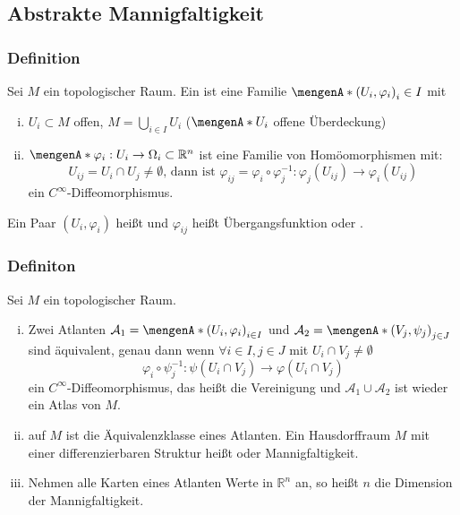 \subsection{Abstrakte Mannigfaltigkeit}
\label{sub:12}

\subsubsection[Definition: Karte und Atlas]{Definition}
\label{ssub:113}
Sei $M$ ein topologischer Raum. Ein  ist eine Familie $\set{(U_i,\varphi_i)}_i\in I$ mit
\begin{enumerate}[(i)]
	\item $U_i \subset M$ offen, $M = \bigcup_{i \in I} U_i$ ($\set{U_i}$ offene Überdeckung)
	\item $\set{\varphi_i:U_i \to \Omega_i \subset \mathds{R}^n}$ ist eine Familie von Homöomorphismen mit:
	\[
		U_{ij} = U_i \cap U_j \neq \emptyset \text{, dann ist } \varphi_{ij} = \varphi_i \circ \varphi_j^{-1}: \varphi_j(U_{ij}) \to \varphi_i(U_{ij})
	\]
	ein $C^{\infty}$-Diffeomorphismus.
\end{enumerate}
Ein Paar $(U_i,\varphi_i)$ heißt  und $\varphi_{ij}$ heißt Übergangsfunktion oder .

\subsubsection[Definition: Abstrakte differenzierbare Mannigfaltigkeit]{Definiton}
\label{ssub:114}
Sei $M$ ein topologischer Raum.
\begin{enumerate}[(i)]
	\item Zwei Atlanten $\mathcal{A}_1 = \set{(U_i,\varphi_i)}_{i\in I}$ und $\mathcal{A}_2 = \set{(V_j,\psi_j)}_{j\in J}$ sind äquivalent, genau dann wenn $\forall i\in I,j\in J$ mit $U_i\cap V_j\neq \emptyset$
	\[
		\varphi_i\circ \psi_j^{-1}:\psi(U_i\cap V_j) \to \varphi(U_i\cap V_j)
	\]
	ein $C^{\infty}$-Diffeomorphismus, das heißt die Vereinigung und $\mathcal{A}_1 \cup \mathcal{A}_2$ ist wieder ein Atlas von $M$.
	\item {} auf $M$ ist die Äquivalenzklasse eines Atlanten. Ein Hausdorffraum $M$ mit einer differenzierbaren Struktur heißt  oder Mannigfaltigkeit.
	\item Nehmen alle Karten eines Atlanten Werte in $\mathds{R}^n$ an, so heißt $n$ die Dimension der Mannigfaltigkeit.
\end{enumerate}

